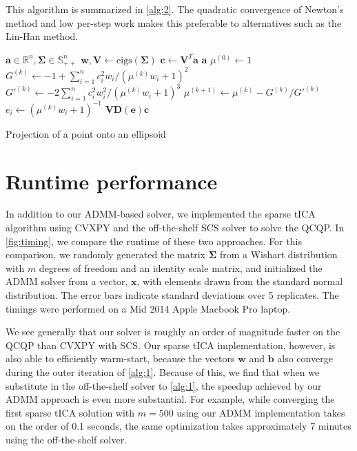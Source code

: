 \documentclass[aip, jcp, reprint, nolinenumbers, twocolumn, nobalancelastpage, nofootinbib]{revtex4-1}
\begin{document}
This algorithm is summarized in \cref{alg:2}. The quadratic convergence of Newton's method and low per-step work makes this preferable to alternatives such as the Lin-Han method.\cite{dai2006fast}

\begin{algorithm}[H]
\begin{algorithmic}
\Require $ \mathbf{a} \in \mathbb{R}^n, \mathbf{\Sigma} \in \mathbb{S}_{++}^n$
\State $\mathbf{w}, \mathbf{V} \gets \mathrm{eigs}(\mathbf{\Sigma})$ 
\State $\mathbf{c} \gets \mathbf{V}^T\mathbf{a}$
\State \Return $\mathbf{a}$ 
\Else
    \State $\mu^{(0)} \gets 1$
     
    \State $G^{(k)} \gets -1 + \sum_{i=1}^n c_i^2 w_i / (\mu^{(k)}w_i + 1)^2$
    \State $G'^{(k)} \gets -2\sum_{i=1}^n c_i^2 w_i^2 / (\mu^{(k)}w_i + 1)^3$
    \State $\mu^{(k+1)} \gets \mu^{(k)} - G^{(k)}/G'^{(k)}$
    \EndWhile
    \State $e_i \gets (\mu^{(k)}w_i + 1)^{-1}$
    \State \Return $\mathbf{V}\mathbf{D}(\mathbf{e})\mathbf{c}$
\EndIf
\caption{\label{alg:2} Projection of a point onto an ellipsoid}
\end{algorithmic}
\end{algorithm}

\section{Runtime performance}
In addition to our ADMM-based solver, we implemented the sparse tICA algorithm using CVXPY and the off-the-shelf SCS solver to solve the QCQP.\cite{cvxpy, o2013operator} In \cref{fig:timing}, we compare the runtime of these two approaches. For this comparison, we randomly generated the matrix $\mathbf{\Sigma}$ from a Wishart distribution with $m$  degrees of freedom and an identity scale matrix, and initialized the ADMM solver from a vector, $\mathbf{x}$, with elements drawn from the standard normal distribution. The error bars indicate standard deviations over 5 replicates. The timings were performed on a Mid 2014 Apple Macbook Pro laptop.

We see generally that our solver is roughly an order of magnitude faster on the QCQP than CVXPY with SCS. Our sparse tICA implementation, however, is also able to efficiently warm-start, because the vectors $\mathbf{w}$ and $\mathbf{b}$ also converge during the outer iteration of \cref{alg:1}. Because of this, we find that when we substitute in the off-the-shelf solver to \cref{alg:1}, the speedup achieved by our ADMM approach is even more substantial. For example, while converging the first sparse tICA solution with $m=500$ using our ADMM implementation takes on the order of 0.1 seconds, the same optimization takes approximately 7 minutes using the off-the-shelf solver.
\end{document}
